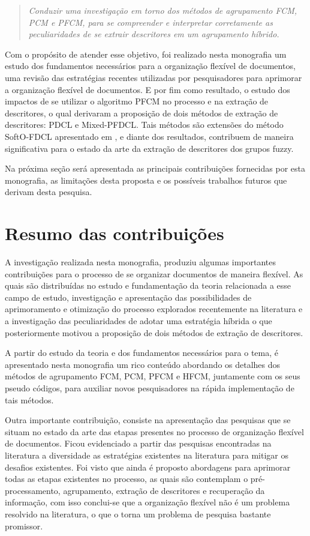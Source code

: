\begin{quote}
\textit{Conduzir uma investigação em torno dos métodos de agrupamento FCM, PCM e PFCM, para
se compreender e interpretar corretamente as peculiaridades de se extrair descritores em um
agrupamento híbrido.}
\end{quote}

Com o propósito de atender esse objetivo, foi realizado nesta monografia um estudo dos fundamentos
necessários para a organização flexível de documentos, uma revisão das estratégias recentes
utilizadas por pesquisadores para aprimorar a organização flexível de documentos. E por fim como
resultado, o estudo dos impactos de se utilizar o algoritmo PFCM no processo e na extração de
descritores, o qual derivaram a proposição de dois métodos de extração de descritores: PDCL e
Mixed-PFDCL. Tais métodos são extensões do método SoftO-FDCL apresentado em \cite{Nogueira2013}, e
diante dos resultados, contribuem de maneira significativa para o estado da arte da extração de
descritores dos grupos fuzzy.

Na próxima seção será apresentada as principais contribuições fornecidas por esta monografia, as
limitações desta proposta e os possíveis trabalhos futuros que derivam desta pesquisa.

\section{Resumo das contribuições}

A investigação realizada nesta monografia, produziu algumas importantes contribuições para o
processo de se organizar documentos de maneira flexível. As quais são distribuídas no estudo e
fundamentação da teoria relacionada a esse campo de estudo, investigação e apresentação das
possibilidades de aprimoramento e otimização do processo explorados recentemente na literatura e a
investigação das peculiaridades de adotar uma estratégia híbrida o que posteriormente motivou a
proposição de dois métodos de extração de descritores. 

A partir do estudo da teoria e dos fundamentos necessários para o tema, é apresentado nesta
monografia um rico conteúdo abordando os detalhes dos métodos de agrupamento FCM, PCM, PFCM e HFCM,
juntamente com os seus pseudo códigos, para auxiliar novos pesquisadores na rápida implementação de
tais métodos.

Outra importante contribuição, consiste na apresentação das pesquisas que se situam no estado da
arte das etapas presentes no processo de organização flexível de documentos. Ficou evidenciado a
partir das pesquisas encontradas na literatura a diversidade as estratégias existentes na literatura
para mitigar os desafios existentes. Foi visto que ainda é proposto abordagens para aprimorar todas
as etapas existentes no processo, as quais são contemplam o pré-processamento, agrupamento, extração
de descritores e recuperação da informação, com isso conclui-se que a organização flexível não é um
problema resolvido na literatura, o que o torna um problema de pesquisa bastante promissor. 

